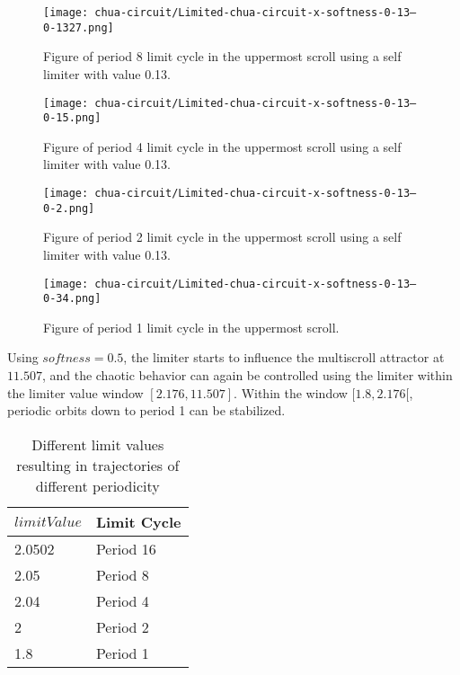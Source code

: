 \documentclass[main]{subfiles}
\begin{document}
\begin{figure}[H]
\centering
\texttt{[image: chua-circuit/Limited-chua-circuit-x-softness-0-13--0-1327.png]}
\caption[Figure of period 8 limit cycle]{Figure of period 8 limit cycle in the uppermost scroll using a self limiter with value 0.13.}
\label{figure:x-0.13-8-limit-cycle-upperscroll-trajectory}
\end{figure}

\begin{figure}[H]
\centering
\texttt{[image: chua-circuit/Limited-chua-circuit-x-softness-0-13--0-15.png]}
\caption[Figure of period 4 limit cycle]{Figure of period 4 limit cycle in the uppermost scroll using a self limiter with value 0.13.}
\label{figure:x-0.13-4-limit-cycle-upperscroll-trajectory}
\end{figure}

\begin{figure}[H]
\centering
\texttt{[image: chua-circuit/Limited-chua-circuit-x-softness-0-13--0-2.png]}
\caption[Figure of period 3 limit cycle]{Figure of period 2 limit cycle in the uppermost scroll using a self limiter with value 0.13.}
\label{figure:x-0.13-2-limit-cycle-upperscroll-trajectory}
\end{figure}

\begin{figure}[H]
\centering
\texttt{[image: chua-circuit/Limited-chua-circuit-x-softness-0-13--0-34.png]}
\caption[Figure of period 1 limit cycle]{Figure of period 1 limit cycle in the uppermost scroll.}
\label{figure:x-0.13-1-limit-cycle-upperscroll-trajectory}
\end{figure}

Using \(softness=0.5\), the limiter starts to influence the multiscroll attractor at \(11.507\), and the chaotic behavior can again be controlled using the limiter within the limiter value window \([2.176,11.507]\). %
%
Within the window \([1.8,2.176[\), periodic orbits down to period 1 can be stabilized.

\begin{table}[H]
\renewcommand{\arraystretch}{1.2}
\center
\begin{tabular}{@{}ll@{}}
	\toprule
   \(limitValue\) & Limit Cycle\\
   \midrule
   2.0502 & Period 16 \\
   2.05 & Period 8 \\ 
   2.04 & Period 4 \\
   2  & Period 2 \\
   1.8 & Period 1 \\
   \bottomrule
\end{tabular}
\caption{Different limit values resulting in trajectories of different periodicity}
\label{table:x-0.5-lowermost-periodicities}
\end{table}
\end{document}
